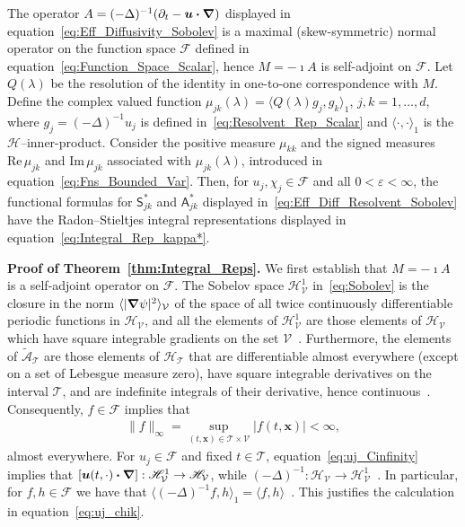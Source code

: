 \documentclass[leqno,onefignum,onetabnum]{siamltex1213}
\newcommand{\thmref}[1]{Theorem~\ref{#1}}
\newcommand\Real{\mbox{Re}\,} %
\newcommand\Imag{\mbox{Im}\,} %
\newcommand{\Tc}{\mathcal{T}}
\newcommand{\Vc}{\mathcal{V}}
\newcommand{\Sm}{\mathsf{S}}
\newcommand{\Am}{\mathsf{A}}
\newcommand{\Hs}{\mathscr{H}}
\newcommand{\As}{\mathscr{A}}
\newcommand{\Fs}{\mathscr{F}}
\newcommand\bnabla{\mbox{\boldmath${\nabla}$}}
\providecommand\bcdot{\boldsymbol{\cdot}}
\newcommand{\vecx}{\boldsymbol{x}}
\newcommand{\vecu}{\boldsymbol{u}}
\begin{document}
%
\begin{theorem}\label{thm:Integral_Reps}
  The operator $A=(-\Delta)^{-1}(\partial_t-\vecu\bcdot\bnabla)$ displayed in
  equation~\eqref{eq:Eff_Diffusivity_Sobolev} is a maximal
  (skew-symmetric) normal operator on the function space $\Fs$ defined
  in equation~\eqref{eq:Function_Space_Scalar}, hence $M=-\imath A$ is 
  self-adjoint on $\Fs$. Let $Q(\lambda)$ be the resolution of the
  identity in one-to-one correspondence with $M$. Define the complex
  valued   function $\mu_{jk}(\lambda)=\langle Q(\lambda)g_j,g_k\rangle_1$, $j,k=1,\ldots,d$, where
  $g_j=(-\Delta)^{-1}u_j$ is defined in~\eqref{eq:Resolvent_Rep_Scalar} and 
  $\langle\cdot,\cdot\rangle_1$ is the $\Hs$--inner-product. Consider the positive measure
  $\mu_{kk}$ and the signed measures $\Real\mu_{jk}$ and $\Imag\mu_{jk}$
  associated with $\mu_{jk}(\lambda)$, introduced in
  equation~\eqref{eq:Fns_Bounded_Var}.  Then, for $u_j,\chi_j\in\Fs$
  and all $0<\varepsilon<\infty$,
  the functional formulas for $\Sm^*_{jk}$ and $\Am^*_{jk}$ displayed
  in~\eqref{eq:Eff_Diff_Resolvent_Sobolev} have the 
  Radon--Stieltjes integral representations displayed in
  equation~\eqref{eq:Integral_Rep_kappa*}.   
% 
\end{theorem}
%

\textbf{Proof of \thmref{thm:Integral_Reps}.}\hspace{1ex}
%
We first establish that $M=-\imath A$ is a self-adjoint operator on
$\Fs$. The Sobelov space $\Hs^1_{\Vc}$ in~\eqref{eq:Sobolev} is the
closure in the norm $\langle|\bnabla\psi|^2\rangle_{\Vc}$ of the space of all twice
continuously differentiable periodic functions in $\Hs_{\Vc}$, and all
the elements of $\Hs^1_{\Vc}$ are those elements of $\Hs_{\Vc}$ which
have square integrable gradients on the set
$\Vc$~\cite{Bhattacharya:AAP:1999:951}. Furthermore, the elements of
$\tilde{\As}_{\Tc}$ are those elements of $\Hs_{\Tc}$ that are
differentiable almost everywhere (except on a set of Lebesgue measure
zero), have square integrable derivatives on the interval
$\Tc$, and are indefinite integrals of their
derivative, hence continuous~\cite{Royden:1988:RA}. Consequently,
$f\in\Fs$ implies that~\cite{Stone:64,Royden:1988:RA}  
%
\begin{align}\label{eq:uj_Cinfinity}
  \|f\|_\infty=\sup_{(t,\vecx)\in\Tc\times\Vc}|f(t,\vecx)|<\infty,
\end{align}
%
almost everywhere. For $u_j\in\Fs$ and fixed $t\in\Tc$,
equation~\eqref{eq:uj_Cinfinity} implies that 
$[\vecu(t,\cdot)\bcdot\bnabla]:\Hs^1_{\Vc}\to\Hs_{\Vc}$, while
$(-\Delta)^{-1}:\Hs_{\Vc}\to\Hs^1_{\Vc}$~\cite{Bhattacharya:AAP:1999:951}. In
particular, for $f,h\in\Fs$ we have that
$\langle(-\Delta)^{-1}f,h\rangle_1=\langle f,h\rangle$~\cite{Bhattacharya:AAP:1999:951}. This 
justifies the calculation in equation~\eqref{eq:uj_chik}.  
\end{document}

